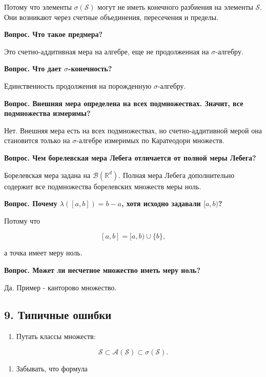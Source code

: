 \documentclass[
  11pt,
  a4paper,
]{article}
\providecommand{\tightlist}{%
  \setlength{\itemsep}{0pt}\setlength{\parskip}{0pt}}
\begin{document}
Потому что элементы \(\sigma(\mathcal S)\) могут не иметь конечного
разбиения на элементы \(\mathcal S\). Они возникают через счетные
объединения, пересечения и пределы.

\textbf{Вопрос. Что такое предмера?}

Это счетно-аддитивная мера на алгебре, еще не продолженная на
\(\sigma\)-алгебру.

\textbf{Вопрос. Что дает \(\sigma\)-конечность?}

Единственность продолжения на порожденную \(\sigma\)-алгебру.

\textbf{Вопрос. Внешняя мера определена на всех подмножествах. Значит,
все подмножества измеримы?}

Нет. Внешняя мера есть на всех подмножествах, но счетно-аддитивной мерой
она становится только на \(\sigma\)-алгебре измеримых по Каратеодори
множеств.

\textbf{Вопрос. Чем борелевская мера Лебега отличается от полной меры
Лебега?}

Борелевская мера задана на \(\mathcal B(\mathbb R^d)\). Полная мера
Лебега дополнительно содержит все подмножества борелевских множеств меры
ноль.

\textbf{Вопрос. Почему \(\lambda([a,b])=b-a\), хотя исходно задавали
\([a,b)\)?}

Потому что

\[
[a,b]=[a,b)\cup\{b\},
\]

а точка имеет меру ноль.

\textbf{Вопрос. Может ли несчетное множество иметь меру ноль?}

Да. Пример - канторово множество.

\subsection{9. Типичные
ошибки}\label{ux442ux438ux43fux438ux447ux43dux44bux435-ux43eux448ux438ux431ux43aux438}

\begin{enumerate}
\def\labelenumi{\arabic{enumi}.}
\tightlist
\item
  Путать классы множеств:
\end{enumerate}

\[
\mathcal S\subset\mathcal A(\mathcal S)\subset\sigma(\mathcal S).
\]

\begin{enumerate}
\def\labelenumi{\arabic{enumi}.}
\setcounter{enumi}{1}
\tightlist
\item
  Забывать, что формула
\end{enumerate}
\end{document}
